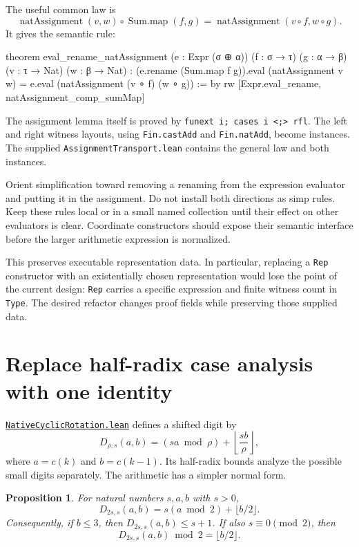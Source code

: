 \documentclass[11pt,letterpaper]{article}
\newcommand{\code}[1]{\nolinkurl{#1}}
\newcommand{\src}[2]{\href{https://github.com/VladimirReshetnikov/ProveIt/blob/60e9c5d620c6c387d932876cfa2d9376f64ea56c/Computability/DiophantineConsistency/Lean/DiophantineConsistency/#1.lean}{\code{#1.lean}}#2}
\newtheorem{proposition}{Proposition}
\begin{document}
The useful common law is
\[
 \operatorname{natAssignment}(v,w)\circ\operatorname{Sum.map}(f,g)
 =\operatorname{natAssignment}(v\circ f,w\circ g).
\]
It gives the semantic rule:

\begin{Lean}
theorem eval_rename_natAssignment
    (e : Expr (σ ⊕ α)) (f : σ → τ) (g : α → β)
    (v : τ → Nat) (w : β → Nat) :
    (e.rename (Sum.map f g)).eval (natAssignment v w) =
      e.eval (natAssignment (v ∘ f) (w ∘ g)) := by
  rw [Expr.eval_rename, natAssignment_comp_sumMap]
\end{Lean}

The assignment lemma itself is proved by \code{funext i; cases i <;> rfl}.
The left and right witness layouts, using \code{Fin.castAdd} and
\code{Fin.natAdd}, become instances. The supplied
\code{AssignmentTransport.lean} contains the general law and both instances.

Orient simplification toward removing a renaming from the expression evaluator
and putting it in the assignment. Do not install both directions as simp rules.
Keep these rules local or in a small named collection until their effect on
other evaluators is clear. Coordinate constructors should expose their semantic
interface before the larger arithmetic expression is normalized.

This preserves executable representation data. In particular, replacing a
\code{Rep} constructor with an existentially chosen representation would lose
the point of the current design: \code{Rep} carries a specific expression
and finite witness count in \code{Type}. The desired refactor changes proof
fields while preserving those supplied data.

\section{Replace half-radix case analysis with one identity}
\label{sec:radix}

\src{NativeCyclicRotation}{ defines a shifted digit by}
\[
 D_{\rho,s}(a,b)=(sa\bmod\rho)+\left\lfloor\frac{sb}{\rho}\right\rfloor,
\]
where $a=c(k)$ and $b=c(k-1)$. Its half-radix bounds analyze the possible
small digits separately. The arithmetic has a simpler normal form.

\begin{proposition}
For natural numbers $s,a,b$ with $s>0$,
\[
 D_{2s,s}(a,b)=s(a\bmod2)+\lfloor b/2\rfloor.
\]
Consequently, if $b\le3$, then $D_{2s,s}(a,b)\le s+1$.
If also $s\equiv0\pmod2$, then
\[
 D_{2s,s}(a,b)\bmod2=\lfloor b/2\rfloor.
\]
\end{proposition}
\end{document}
